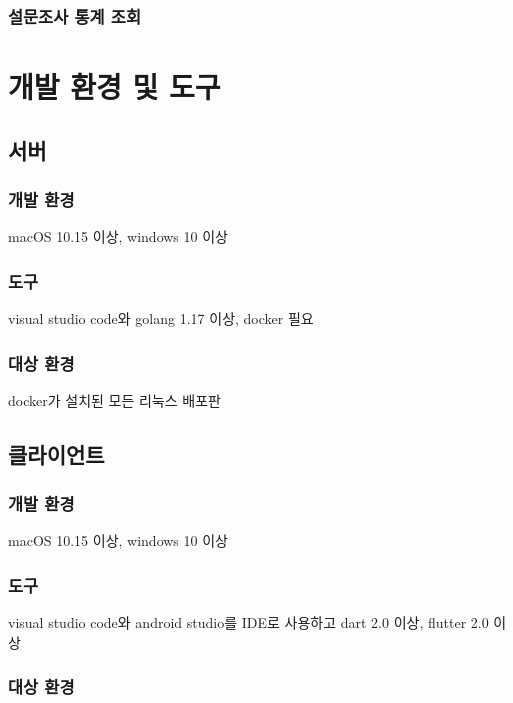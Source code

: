 \documentclass[11pt,a4paper,left=15mm,right=15mm,top=20mm,bottom=20mm]{article}
\begin{document}
        \subsubsection{설문조사 통계 조회}

\section{개발 환경 및 도구}

    \subsection{서버}

        \subsubsection{개발 환경}

            macOS 10.15 이상, windows 10 이상

        \subsubsection{도구}

            visual studio code와 golang 1.17 이상, docker 필요

        \subsubsection{대상 환경}

            docker가 설치된 모든 리눅스 배포판

    \subsection{클라이언트}

        \subsubsection{개발 환경}

            macOS 10.15 이상, windows 10 이상

        \subsubsection{도구}

            visual studio code와 android studio를 IDE로 사용하고 dart 2.0 이상, flutter 2.0 이상

        \subsubsection{대상 환경}
\end{document}
